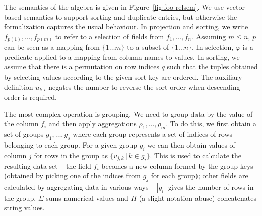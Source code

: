 \documentclass[a4paper,UKenglish]{lipics-v2016}
\theoremstyle{plain}
\theoremstyle{definition}
\begin{document}
The semantics of the algebra is given in Figure~\ref{fig:foo-relsem}. We use vector-based semantics
to support sorting and duplicate entries, but otherwise the formalization captures the usual
behaviour. In projection and sorting, we write $f_{p(1)}, \ldots, f_{p(m)}$ to refer to a selection
of fields from $f_1, \ldots, f_n$. Assuming $m\leq n$, $p$ can be seen as a mapping from $\{1\ldots m\}$
to a subset of $\{1\ldots n\}$. In selection, $\varphi$ is a predicate applied to a mapping from 
column names to values. In sorting, we assume that there is a permutation on row indices $q$ such
that the tuples obtained by selecting values according to the given sort key are ordered. The 
auxiliary definition $u_{k,l}$ negates the number to reverse the sort order when descending order
is required.

The most complex operation is grouping. We need to group data by the value of the column $f_i$ and
then apply aggregations $\rho_1,\ldots,\rho_m$. To do this, we first obtain a set of groups $g_1,\ldots, g_s$
where each group represents a set of indices of rows belonging to each group. For a given group 
$g_i$ we can then obtain values of column $j$ for rows in the group as $\{v_{j,k}\,|\, k\in g_i\}$.
This is used to calculate the resulting data set -- the field $f_i$ becomes a new column formed
by the group keys (obtained by picking one of the indices from $g_j$ for each group); other fields
are calculated by aggregating data in various ways -- $|g_i|$ gives the number of rows in the group,
$\Sigma$ sums numerical values and $\Pi$ (a slight notation abuse) concatenates string values. 

\end{document}
